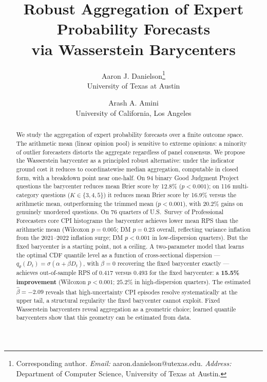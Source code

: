 \documentclass[12pt]{article}
\numberwithin{equation}{section}
\begin{document}
\title{Robust Aggregation of Expert Probability Forecasts\\
       via Wasserstein Barycenters}

\author{Aaron J. Danielson\thanks{Corresponding author.
        \textit{Email:} aaron.danielson@utexas.edu.
        \textit{Address:} Department of Computer Science, University of Texas at Austin.}\\[0.5ex]
        University of Texas at Austin
        \and
        Arash A. Amini\\[0.5ex]
        University of California, Los Angeles}

\date{}
\maketitle

\begin{abstract}
We study the aggregation of expert probability forecasts over a finite outcome space.
The arithmetic mean (linear opinion pool) is sensitive to extreme opinions: a minority of outlier forecasters distorts the aggregate regardless of panel consensus.
We propose the Wasserstein barycenter as a principled robust alternative: under the indicator ground cost it reduces to coordinatewise median aggregation, computable in closed form, with a breakdown point near one-half.
On 94 binary Good Judgment Project questions the barycenter reduces mean Brier score by 12.8\% ($p < 0.001$); on 116 multi-category questions ($K \in \{3,4,5\}$) it reduces mean Brier score by 16.9\% versus the arithmetic mean, outperforming the trimmed mean ($p < 0.001$), with 20.2\% gains on genuinely unordered questions.
On 76 quarters of U.S.\ Survey of Professional Forecasters core CPI histograms the barycenter achieves lower mean RPS than the arithmetic mean (Wilcoxon $p = 0.005$; DM $p = 0.23$ overall, reflecting variance inflation from the 2021--2022 inflation surge; DM $p < 0.001$ in low-dispersion quarters).
But the fixed barycenter is a starting point, not a ceiling.
A two-parameter model that learns the optimal CDF quantile level as a function of cross-sectional dispersion --- $q_\theta(D_t) = \sigma(\alpha + \beta D_t)$, with $\beta = 0$ recovering the fixed barycenter exactly --- achieves out-of-sample RPS of $0.417$ versus $0.493$ for the fixed barycenter: a \textbf{15.5\% improvement} (Wilcoxon $p < 0.001$; $25.2\%$ in high-dispersion quarters).
The estimated $\hat\beta = -2.09$ reveals that high-uncertainty CPI episodes resolve systematically at the upper tail, a structural regularity the fixed barycenter cannot exploit.
Fixed Wasserstein barycenters reveal aggregation as a geometric choice; learned quantile barycenters show that this geometry can be estimated from data.
\end{abstract}
\end{document}
